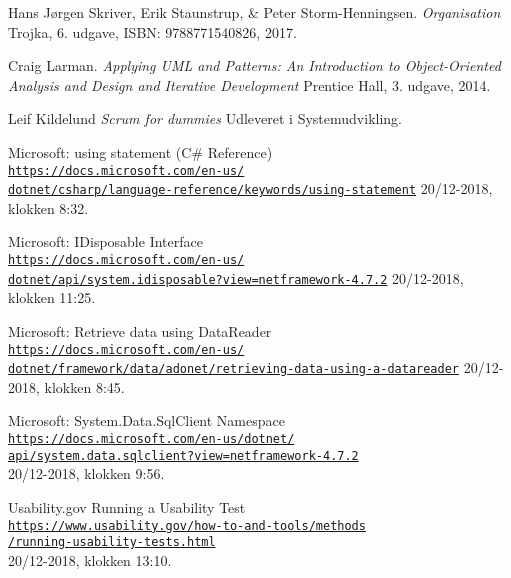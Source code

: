 \begin{thebibliography}{9}

Hans Jørgen Skriver, Erik Staunstrup, \& Peter Storm-Henningsen.
\textit{Organisation}
Trojka, 6. udgave, ISBN: 9788771540826, 2017.

Craig Larman.
\textit{Applying UML and Patterns: An Introduction to Object-Oriented Analysis and Design and Iterative Development}
Prentice Hall, 3. udgave, 2014.

Leif Kildelund
\textit{Scrum for dummies}
Udleveret i Systemudvikling.

Microsoft: using statement (C\# Reference)
\\\href{https://docs.microsoft.com/en-us/dotnet/csharp/language-reference/keywords/using-statement}{\texttt{https://docs.microsoft.com/en-us/\\dotnet/csharp/language-reference/keywords/using-statement}}
20/12-2018, klokken 8:32.

Microsoft: IDisposable Interface
\\\href{https://docs.microsoft.com/en-us/dotnet/api/system.idisposable?view=netframework-4.7.2}{\texttt{https://docs.microsoft.com/en-us/\\dotnet/api/system.idisposable?view=netframework-4.7.2}}
20/12-2018, klokken 11:25.

Microsoft: Retrieve data using DataReader
\\\href{https://docs.microsoft.com/en-us/dotnet/framework/data/adonet/retrieving-data-using-a-datareader}{\texttt{https://docs.microsoft.com/en-us/\\dotnet/framework/data/adonet/retrieving-data-using-a-datareader}}
20/12-2018, klokken 8:45.

Microsoft: System.Data.SqlClient Namespace
\\\href{https://docs.microsoft.com/en-us/dotnet/api/system.data.sqlclient?view=netframework-4.7.2}{\texttt{https://docs.microsoft.com/en-us/dotnet/\\api/system.data.sqlclient?view=netframework-4.7.2}}
\\20/12-2018, klokken 9:56.

Usability.gov Running a Usability Test
\\\href{https://www.usability.gov/how-to-and-tools/methods/running-usability-tests.html}{\texttt{https://www.usability.gov/how-to-and-tools/methods\\/running-usability-tests.html}}
\\20/12-2018, klokken 13:10.


\end{thebibliography}
